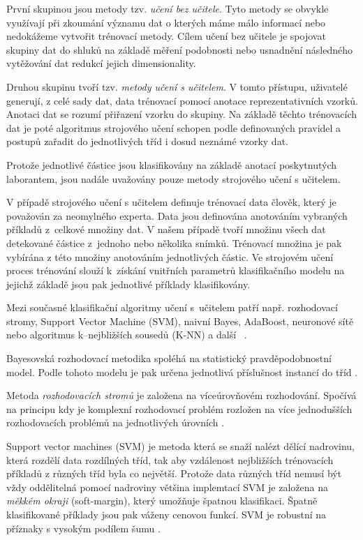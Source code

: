 \documentclass[11pt,twoside,a4paper,table]{book}
\begin{document}
První skupinou jsou metody tzv. \textit{učení bez učitele}. Tyto metody se obvykle využívají při zkoumání významu dat o kterých máme málo informací nebo nedokážeme vytvořit trénovací metody. Cílem učení bez učitele je spojovat skupiny dat do shluků na základě měření podobnosti nebo usnadnění následného vytěžování dat redukcí jejich dimensionality.

Druhou skupinu tvoří tzv. \textit{metody učení s učitelem}. V tomto přístupu, uživatelé generují, z celé sady dat, data trénovací pomocí anotace reprezentativních vzorků. Anotaci dat se rozumí přiřazení vzorku do skupiny. Na základě těchto trénovacích dat je poté algoritmus strojového učení schopen podle definovaných pravidel a postupů zařadit do jednotlivých tříd i dosud neznámé vzorky dat.

Protože jednotlivé částice jsou klasifikovány na základě anotací poskytnutých laborantem, jsou nadále uvažovány pouze metody strojového učení s učitelem.

V případě strojového učení s učitelem definuje trénovací data člověk, který je považován za neomylného experta. Data jsou definována anotováním vybraných příkladů z~celkové množiny dat. V našem případě tvoří množinu všech dat detekované částice z~jednoho nebo několika snímků. Trénovací množina je pak vybírána z této množiny anotováním jednotlivých částic. Ve strojovém učení proces trénování slouží k~získání vnitřních parametrů klasifikačního modelu na jejichž základě jsou pak jednotlivé příklady klasifikovány.

Mezi současné klasifikační algoritmy učení s~učitelem patří např. rozhodovací stromy, Support Vector Machine (SVM), naivní Bayes, AdaBoost, neuronové sítě nebo algoritmus k--nejbližších sousedů (K-NN) a další ~\cite{book:pattern_class}.

Bayesovská rozhodovací metodika spoléhá na statistický pravděpodobnostní model. Podle tohoto modelu je pak určena jednotlivá příslušnost instancí do tříd \cite{art:neural_networks}.

Metoda \textit{rozhodovacích stromů} je založena na víceúrovňovém rozhodování. Spočívá na principu kdy je komplexní rozhodovací problém rozložen na více jednodušších rozhodovacích problémů na jednotlivých úrovních \cite{art:decision_trees}. 

Support vector machines (SVM) je metoda která se snaží nalézt dělící nadrovinu, která rozdělí data rozdílných tříd, tak aby vzdálenost nejbližších trénovacích příkladů z různých tříd byla co největší. Protože data různých tříd nemusí být vždy oddělitelná pomocí nadroviny většina implemtací SVM je založena na \textit{měkkém okraji} (soft-margin), který umožňuje špatnou klasifikaci. Špatně klasifikované příklady jsou pak váženy cenovou funkcí. SVM je robustní na příznaky s vysokým podílem šumu \cite{art:machine_in_cell}.
\end{document}

